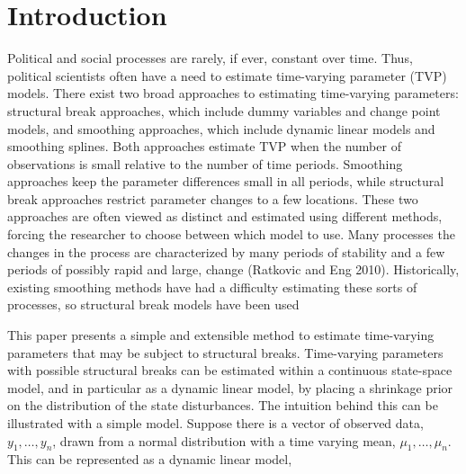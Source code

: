 \begin{knitrout}
\color{fgcolor}\begin{kframe}


{\ttfamily\noindent\itshape\color{messagecolor}{\#\# Loading required package: methods}}\end{kframe}
\end{knitrout}
\newcommand{\ModelII}[1]{\texttt{#1}}


\section{Introduction}
\label{dlm:sec:introduction}

Political and social processes are rarely, if ever, constant over time.
Thus, political scientists often have a need to estimate time-varying parameter (TVP) models.
There exist two broad approaches to estimating time-varying parameters: structural break approaches, which include dummy variables and change point models, and smoothing approaches, which include dynamic linear models and smoothing splines. 
Both approaches estimate TVP when the number of observations is small relative to the number of time periods. 
Smoothing approaches keep the parameter differences small in all periods, while structural break approaches restrict parameter changes to a few locations. 
These two approaches are often viewed as distinct and estimated using different methods, forcing the researcher to choose between which model to use.
Many processes the changes in the process are characterized by many periods of stability and a few periods of possibly rapid and large, change (Ratkovic and Eng 2010).
Historically, existing smoothing methods have had a difficulty estimating these sorts of processes, so structural break models have been used

This paper presents a simple and extensible method to estimate time-varying parameters that may be subject to structural breaks. 
Time-varying parameters with possible structural breaks can be estimated within a continuous state-space model, and in particular as a dynamic linear model, by placing a shrinkage prior on the distribution of the state disturbances.
The intuition behind this can be illustrated with a simple model.
Suppose there is a vector of observed data, $y_{1}, \dots, y_{n}$, drawn from a normal distribution with a time varying mean, $\mu_{1}, \dots, \mu_{n}$.
This can be represented as a dynamic linear model,

